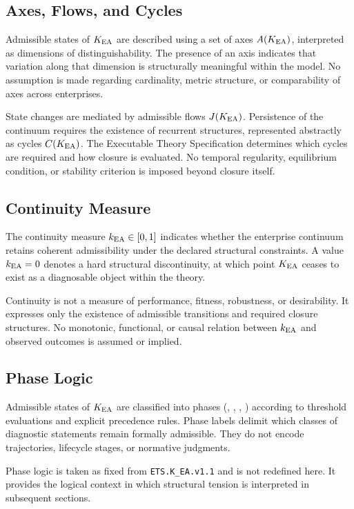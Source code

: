 \subsection{Axes, Flows, and Cycles}

Admissible states of $K_{\mathrm{EA}}$ are described using a set of axes
$A(K_{\mathrm{EA}})$, interpreted as dimensions of distinguishability. The presence
of an axis indicates that variation along that dimension is
structurally meaningful within the model. No assumption is made
regarding cardinality, metric structure, or comparability of axes across
enterprises.

State changes are mediated by admissible flows $J(K_{\mathrm{EA}})$. Persistence of
the continuum requires the existence of recurrent structures,
represented abstractly as cycles $C(K_{\mathrm{EA}})$. The Executable Theory
Specification determines which cycles are required and how closure is
evaluated. No temporal regularity, equilibrium condition, or stability
criterion is imposed beyond closure itself.

\subsection{Continuity Measure}

The continuity measure $k_{\mathrm{EA}} \in [0,1]$ indicates whether the enterprise
continuum retains coherent admissibility under the declared structural
constraints. A value $k_{\mathrm{EA}} = 0$ denotes a hard structural discontinuity,
at which point $K_{\mathrm{EA}}$ ceases to exist as a diagnosable object within the
theory.

Continuity is not a measure of performance, fitness, robustness, or
desirability. It expresses only the existence of admissible transitions
and required closure structures. No monotonic, functional, or causal
relation between $k_{\mathrm{EA}}$ and observed outcomes is assumed or implied.

\subsection{Phase Logic}

Admissible states of $K_{\mathrm{EA}}$ are classified into phases
(\PHASESUCCESS, \PHASEINERTIA, \PHASECOLLAPSE, \PHASESTOP) according to
threshold evaluations and explicit precedence rules. Phase labels
delimit which classes of diagnostic statements remain formally
admissible. They do not encode trajectories, lifecycle stages, or
normative judgments.

Phase logic is taken as fixed from \texttt{ETS.K\_EA.v1.1} and is not
redefined here. It provides the logical context in which structural
tension is interpreted in subsequent sections.

